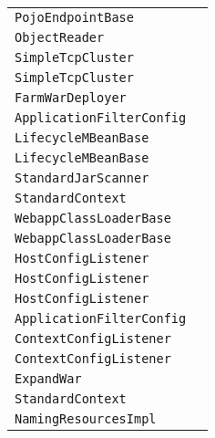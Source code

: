\begin{center}
\begin{tabular}{ll}
\lstinline/PojoEndpointBase/&\raisebox{0pt}{\lstinline/ onError(Session,Throwable)/}\\ 
\lstinline/ObjectReader/&\raisebox{0pt}{\lstinline/ ObjectReader(Socketsocket)/}\\ 
\lstinline/SimpleTcpCluster/&\raisebox{0pt}{\lstinline/ memberDisappeared(Member)/}\\ 
\lstinline/SimpleTcpCluster/&\raisebox{0pt}{\lstinline/ memberDisappeared(Member)/}\\ 
\lstinline/FarmWarDeployer/&\raisebox{0pt}{\lstinline/ booleancopy(File,File)/}\\ 
\lstinline/ApplicationFilterConfig/&\raisebox{0pt}{\lstinline/ unregisterJMX()/}\\ 
\lstinline/LifecycleMBeanBase/&\raisebox{0pt}{\lstinline/ unregister(ObjectNameon)/}\\ 
\lstinline/LifecycleMBeanBase/&\raisebox{0pt}{\lstinline/ unregister(ObjectNameon)/}\\ 
\lstinline/StandardJarScanner/&\raisebox{0pt}{\lstinline/ scan(JarScanType)/}\\ 
\lstinline/StandardContext/&\raisebox{0pt}{\lstinline/ checkUnusualURLPattern(String)/}\\ 
\lstinline/WebappClassLoaderBase/&\raisebox{0pt}{\lstinline/ findClassInternal(String)/}\\ 
\lstinline/WebappClassLoaderBase/&\raisebox{0pt}{\lstinline/ findClassInternal(String)/}\\ 
\lstinline/HostConfigListener/&\raisebox{0pt}{\lstinline/ checkUndeploy()/}\\ 
\lstinline/HostConfigListener/&\raisebox{0pt}{\lstinline/ checkUndeploy()/}\\ 
\lstinline/HostConfigListener/&\raisebox{0pt}{\lstinline/ checkUndeploy()/}\\ 
\lstinline/ApplicationFilterConfig/&\raisebox{0pt}{\lstinline/ unregisterJMX()/}\\ 
\lstinline/ContextConfigListener/&\raisebox{0pt}{\lstinline/ processAnnotationsFile(File)/}\\ 
\lstinline/ContextConfigListener/&\raisebox{0pt}{\lstinline/ processAnnotationsFile(File)/}\\ 
\lstinline/ExpandWar/&\raisebox{0pt}{\lstinline/ booleandeleteDir(Filedir,booleanlogFailure)/}\\ 
\lstinline/StandardContext/&\raisebox{0pt}{\lstinline/ checkUnusualURLPattern(String)/}\\ 
\lstinline/NamingResourcesImpl/&\raisebox{0pt}{\lstinline/ destroyInternal())/}\\ 

\end{tabular}
\end{center}
